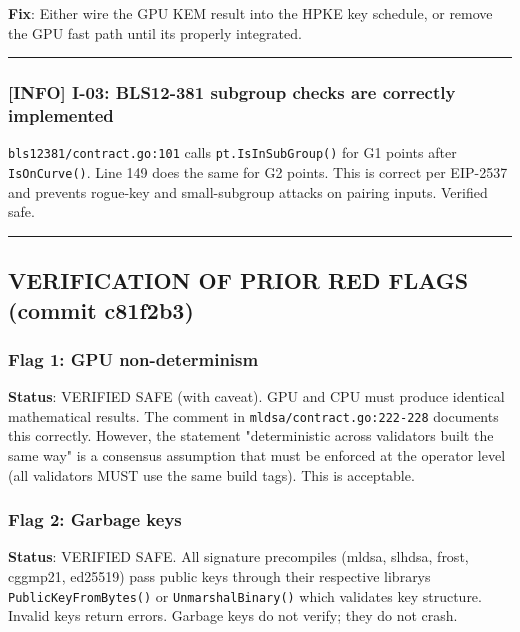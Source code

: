\documentclass[
]{article}
\begin{document}
\textbf{Fix}: Either wire the GPU KEM result into the HPKE key schedule,
or remove the GPU fast path until it\textquotesingle s properly
integrated.

\begin{center}\rule{0.5\linewidth}{0.5pt}\end{center}

\subsubsection{{[}INFO{]} I-03: BLS12-381 subgroup checks are correctly
implemented}\label{info-i-03-bls12-381-subgroup-checks-are-correctly-implemented}

\texttt{bls12381/contract.go:101} calls \texttt{pt.IsInSubGroup()} for
G1 points after \texttt{IsOnCurve()}. Line 149 does the same for G2
points. This is correct per EIP-2537 and prevents rogue-key and
small-subgroup attacks on pairing inputs. Verified safe.

\begin{center}\rule{0.5\linewidth}{0.5pt}\end{center}

\subsection{VERIFICATION OF PRIOR RED FLAGS (commit
c81f2b3)}\label{verification-of-prior-red-flags-commit-c81f2b3}

\subsubsection{Flag 1: GPU
non-determinism}\label{flag-1-gpu-non-determinism}

\textbf{Status}: VERIFIED SAFE (with caveat). GPU and CPU must produce
identical mathematical results. The comment in
\texttt{mldsa/contract.go:222-228} documents this correctly. However,
the statement "deterministic across validators built the same way" is a
consensus assumption that must be enforced at the operator level (all
validators MUST use the same build tags). This is acceptable.

\subsubsection{Flag 2: Garbage keys}\label{flag-2-garbage-keys}

\textbf{Status}: VERIFIED SAFE. All signature precompiles (mldsa,
slhdsa, frost, cggmp21, ed25519) pass public keys through their
respective library\textquotesingle s \texttt{PublicKeyFromBytes()} or
\texttt{UnmarshalBinary()} which validates key structure. Invalid keys
return errors. Garbage keys do not verify; they do not crash.
\end{document}
